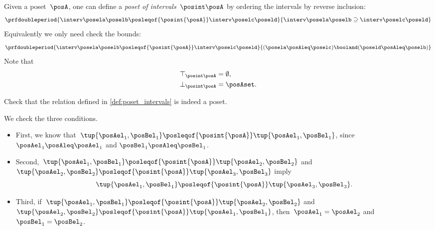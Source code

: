 \begin{definition}
    \label{def:poset_intervals}
    Given a poset~$\posA$, one can define a \emph{poset of intervals}~$\posint\posA$
    by ordering the intervals by reverse inclusion:
    \begin{equation}
        \prfdoubleperiod{
            \interv \posela \poselb
            \posleqof{\posint{\posA}}
            \interv \poselc \poseld
        }{
            \interv \posela \poselb
            \supseteq
            \interv \poselc \poseld
        }
    \end{equation}
    Equivalently we only need check the bounds:
    \begin{equation}
        \prfdoubleperiod{
            \interv \posela \poselb
            \posleqof{\posint{\posA}}
            \interv \poselc \poseld
        }{
            (\posela \posAleq \poselc ) \booland (\poseld \posAleq \poselb)
        }
    \end{equation}
    Note that
    \begin{align}
        \top_{\posint \posA} & = \emptyset, \\
        \bot_{\posint \posA} & = \posAset.
    \end{align}
\end{definition}
\begin{exercise}
    Check that the relation defined in \cref{def:poset_intervals} is indeed a poset.
\end{exercise}
\begin{solution}
    We check the three conditions.
    \begin{itemize}
        \item First, we know that~$\tup{\posAel_1,\posBel_1}\posleqof{\posint{\posA}}\tup{\posAel_1,\posBel_1}$, since $\posAel_1\posAleq \posAel_1$ and $\posBel_1\posAleq \posBel_1$.
        \item Second,~$\tup{\posAel_1,\posBel_1}\posleqof{\posint{\posA}}\tup{\posAel_2,\posBel_2}$ and $\tup{\posAel_2,\posBel_2}\posleqof{\posint{\posA}}\tup{\posAel_3,\posBel_3}$ imply
              \begin{equation}
                  \tup{\posAel_1,\posBel_1}\posleqof{\posint{\posA}}\tup{\posAel_3,\posBel_3}.
              \end{equation}
        \item Third, if~$\tup{\posAel_1,\posBel_1}\posleqof{\posint{\posA}}\tup{\posAel_2,\posBel_2}$ and $\tup{\posAel_2,\posBel_2}\posleqof{\posint{\posA}}\tup{\posAel_1,\posBel_1}$, then~$\posAel_1=\posAel_2$ and~$\posBel_1=\posBel_2$.
    \end{itemize}
\end{solution}

